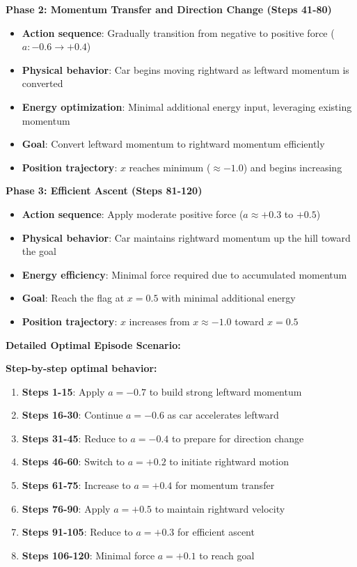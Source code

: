 \documentclass[12pt]{article}
\begin{document}
{{{\textbf{Phase 2: Momentum Transfer and Direction Change (Steps 41-80)}
\begin{itemize}
    \item \textbf{Action sequence}: Gradually transition from negative to positive force ($a: -0.6 \rightarrow +0.4$)
    \item \textbf{Physical behavior}: Car begins moving rightward as leftward momentum is converted
    \item \textbf{Energy optimization}: Minimal additional energy input, leveraging existing momentum
    \item \textbf{Goal}: Convert leftward momentum to rightward momentum efficiently
    \item \textbf{Position trajectory}: $x$ reaches minimum ($\approx -1.0$) and begins increasing
\end{itemize}

\textbf{Phase 3: Efficient Ascent (Steps 81-120)}
\begin{itemize}
    \item \textbf{Action sequence}: Apply moderate positive force ($a \approx +0.3$ to $+0.5$)
    \item \textbf{Physical behavior}: Car maintains rightward momentum up the hill toward the goal
    \item \textbf{Energy efficiency}: Minimal force required due to accumulated momentum
    \item \textbf{Goal}: Reach the flag at $x = 0.5$ with minimal additional energy
    \item \textbf{Position trajectory}: $x$ increases from $x \approx -1.0$ toward $x = 0.5$
\end{itemize}

\textbf{Detailed Optimal Episode Scenario:}

\textbf{Step-by-step optimal behavior:}
\begin{enumerate}
    \item \textbf{Steps 1-15}: Apply $a = -0.7$ to build strong leftward momentum
    \item \textbf{Steps 16-30}: Continue $a = -0.6$ as car accelerates leftward
    \item \textbf{Steps 31-45}: Reduce to $a = -0.4$ to prepare for direction change
    \item \textbf{Steps 46-60}: Switch to $a = +0.2$ to initiate rightward motion
    \item \textbf{Steps 61-75}: Increase to $a = +0.4$ for momentum transfer
    \item \textbf{Steps 76-90}: Apply $a = +0.5$ to maintain rightward velocity
    \item \textbf{Steps 91-105}: Reduce to $a = +0.3$ for efficient ascent
    \item \textbf{Steps 106-120}: Minimal force $a = +0.1$ to reach goal
\end{enumerate}

}}}
\end{document}
